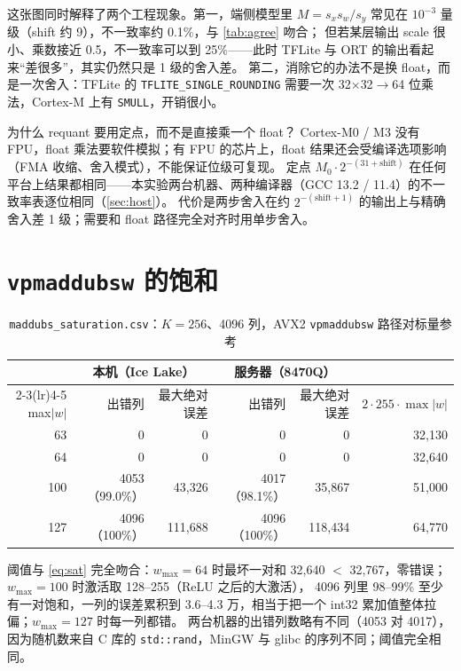 \documentclass[11pt,a4paper]{ctexart}
\begin{document}
这张图同时解释了两个工程现象。第一，端侧模型里 $M = s_x s_w/s_y$ 常见在 $10^{-3}$ 量级（shift 约 9），不一致率约 0.1\%，与 \cref{tab:agree} 吻合；
但若某层输出 scale 很小、乘数接近 0.5，不一致率可以到 25\%——此时 TFLite 与 ORT 的输出看起来“差很多”，其实仍然只是 1 级的舍入差。
第二，消除它的办法不是换 float，而是一次舍入：TFLite 的 \texttt{TFLITE\_SINGLE\_ROUNDING} 需要一次 32$\times$32$\to$64 位乘法，Cortex-M 上有 \texttt{SMULL}，开销很小。

\begin{iqbox}{为什么 requant 要用定点，而不是直接乘一个 float？}
Cortex-M0 / M3 没有 FPU，float 乘法要软件模拟；有 FPU 的芯片上，float 结果还会受编译选项影响（FMA 收缩、舍入模式），不能保证位级可复现。
定点 $M_0\cdot 2^{-(31+\mathrm{shift})}$ 在任何平台上结果都相同——本实验两台机器、两种编译器（GCC 13.2 / 11.4）的不一致率表逐位相同（\cref{sec:host}）。
代价是两步舍入在约 $2^{-(\mathrm{shift}+1)}$ 的输出上与精确舍入差 1 级；需要和 float 路径完全对齐时用单步舍入。
\end{iqbox}

\section{\texttt{vpmaddubsw} 的饱和}\label{sec:sat}

\begin{table}[H]
\centering\small
\caption{\texttt{maddubs\_saturation.csv}：$K=256$、4096 列，AVX2 \texttt{vpmaddubsw} 路径对标量参考}\label{tab:sat}
\begin{tabular}{rrrrrr}
\toprule
 & \multicolumn{2}{c}{本机（Ice Lake）} & \multicolumn{2}{c}{服务器（8470Q）} & \\
\cmidrule(lr){2-3}\cmidrule(lr){4-5}
max$|w|$ & 出错列 & 最大绝对误差 & 出错列 & 最大绝对误差 & $2\cdot255\cdot\max|w|$ \\
\midrule
63 & 0 & 0 & 0 & 0 & 32,130 \\
64 & 0 & 0 & 0 & 0 & 32,640 \\
100 & 4053（99.0\%） & 43,326 & 4017（98.1\%） & 35,867 & 51,000 \\
127 & 4096（100\%） & 111,688 & 4096（100\%） & 118,434 & 64,770 \\
\bottomrule
\end{tabular}
\end{table}

阈值与 \cref{eq:sat} 完全吻合：$w_{\max}=64$ 时最坏一对和 32,640 $<$ 32,767，零错误；$w_{\max}=100$ 时激活取 128--255（ReLU 之后的大激活），
4096 列里 98--99\% 至少有一对饱和，一列的误差累积到 3.6--4.3 万，相当于把一个 int32 累加值整体拉偏；$w_{\max}=127$ 时每一列都错。
两台机器的出错列数略有不同（4053 对 4017），因为随机数来自 C 库的 \texttt{std::rand}，MinGW 与 glibc 的序列不同；阈值完全相同。
\end{document}
